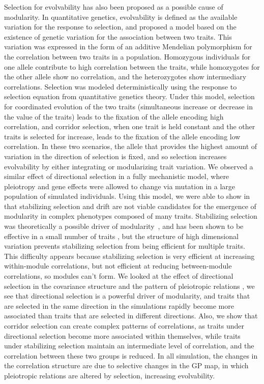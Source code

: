 \begin{refsection}
Selection for evolvability has
also been proposed as a possible cause of modularity. In quantitative
genetics, evolvability is defined as the available variation for the
response to selection, and \textcite{Pavlicev2011-wz}
proposed a model based on the existence of genetic variation for the
association between two traits. This variation was expressed in the form
of an additive Mendelian polymorphism for the correlation between two
traits in a population. Homozygous individuals for one allele contribute
to high correlation between the traits, while homozygotes for the other
allele show no correlation, and the heterozygotes show intermediary
correlations. Selection was modeled deterministically using the response
to selection equation from quantitative genetics theory. 
Under this model, selection for coordinated
evolution of the two traits (simultaneous increase or decrease in the
value of the traits) leads to the fixation of the allele encoding high
correlation, and corridor selection, when one trait is held constant and
the other traits is selected for increase, leads to the fixation of the
allele encoding low correlation. In these two scenarios, the allele that
provides the highest amount of variation in the direction of selection
is fixed, and so selection increases evolvability by either integrating
or modularizing trait variation. We observed a similar effect of
directional selection in a fully mechanistic model, where pleiotropy and
gene effects were allowed to change via mutation in a large population
of simulated individuals. Using this model, we were able to show in
\textcite{Melo2015-bk} that stabilizing selection and drift are not viable
candidates for the emergence of modularity in complex phenotypes
composed of many traits. Stabilizing selection was theoretically a
possible driver of modularity~\parencite{Lande1980-kn, Cheverud1984-mi}, and
has been shown to be effective in a small number of traits
\parencite{Jones2007-xe, Jones2014-wj}, but the structure of high
dimensional variation prevents stabilizing selection from being
efficient for multiple traits. This difficulty appears because
stabilizing selection is very efficient at increasing within-module
correlations, but not efficient at reducing between-module correlations,
so modules can't form. We looked at the effect of directional selection
in the covariance structure and the pattern of pleiotropic relations
\parencite{Melo2016-yw}, we see that directional selection is a powerful
driver of modularity, and traits that are selected in the same direction
in the simulations rapidly become more associated than traits that are
selected in different directions. Also, we show that corridor selection
can create complex patterns of correlations, as traits under directional
selection become more associated within themselves, while traits under
stabilizing selection maintain an intermediate level of correlation, and
the correlation between these two groups is reduced. In all simulation,
the changes in the correlation structure are due to selective changes in
the GP map, in which pleiotropic relations are altered by selection,
increasing evolvability.


\end{refsection}
